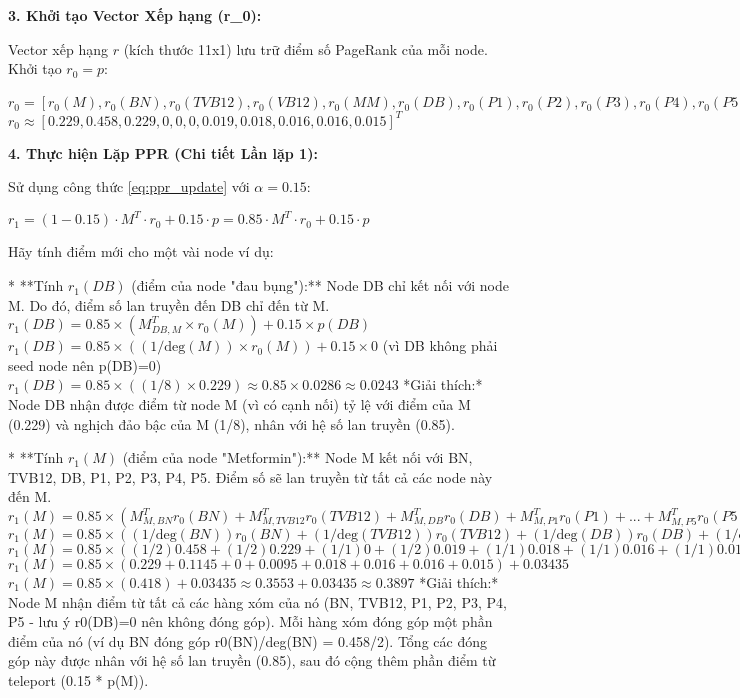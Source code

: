 \documentclass[../main.tex]{subfiles}
\begin{document}
\textbf{3. Khởi tạo Vector Xếp hạng (r_0):}

Vector xếp hạng \(r\) (kích thước 11x1) lưu trữ điểm số PageRank của mỗi node. Khởi tạo \(r_0 = p\):

\(r_0 = [r_0(M), r_0(BN), r_0(TVB12), r_0(VB12), r_0(MM), r_0(DB), r_0(P1), r_0(P2), r_0(P3), r_0(P4), r_0(P5)]^T\)
\(r_0 \approx [0.229, 0.458, 0.229, 0, 0, 0, 0.019, 0.018, 0.016, 0.016, 0.015]^T\)

\textbf{4. Thực hiện Lặp PPR (Chi tiết Lần lặp 1):}

Sử dụng công thức \ref{eq:ppr_update} với \(\alpha = 0.15\):

\(r_{1} = (1-0.15) \cdot M^T \cdot r_0 + 0.15 \cdot p = 0.85 \cdot M^T \cdot r_0 + 0.15 \cdot p\)

Hãy tính điểm mới cho một vài node ví dụ:

*   **Tính \(r_1(DB)\) (điểm của node "đau bụng"):**
    Node DB chỉ kết nối với node M. Do đó, điểm số lan truyền đến DB chỉ đến từ M.
    \(r_1(DB) = 0.85 \times (M^T_{DB, M} \times r_0(M)) + 0.15 \times p(DB)\)
    \(r_1(DB) = 0.85 \times ( (1 / \text{deg}(M)) \times r_0(M) ) + 0.15 \times 0\) (vì DB không phải seed node nên p(DB)=0)
    \(r_1(DB) = 0.85 \times ( (1/8) \times 0.229 ) \approx 0.85 \times 0.0286 \approx 0.0243\)
    *Giải thích:* Node DB nhận được điểm từ node M (vì có cạnh nối) tỷ lệ với điểm của M (0.229) và nghịch đảo bậc của M (1/8), nhân với hệ số lan truyền (0.85).

*   **Tính \(r_1(M)\) (điểm của node "Metformin"):**
    Node M kết nối với BN, TVB12, DB, P1, P2, P3, P4, P5. Điểm số sẽ lan truyền từ tất cả các node này đến M.
    \(r_1(M) = 0.85 \times ( M^T_{M,BN}r_0(BN) + M^T_{M,TVB12}r_0(TVB12) + M^T_{M,DB}r_0(DB) + M^T_{M,P1}r_0(P1) + ... + M^T_{M,P5}r_0(P5) ) + 0.15 \times p(M)\)
    \(r_1(M) = 0.85 \times ( (1/\text{deg}(BN))r_0(BN) + (1/\text{deg}(TVB12))r_0(TVB12) + (1/\text{deg}(DB))r_0(DB) + (1/\text{deg}(P1))r_0(P1) + ... ) + 0.15 \times 0.229\)
    \(r_1(M) = 0.85 \times ( (1/2)0.458 + (1/2)0.229 + (1/1)0 + (1/2)0.019 + (1/1)0.018 + (1/1)0.016 + (1/1)0.016 + (1/1)0.015 ) + 0.03435\)
    \(r_1(M) = 0.85 \times ( 0.229 + 0.1145 + 0 + 0.0095 + 0.018 + 0.016 + 0.016 + 0.015 ) + 0.03435\)
    \(r_1(M) = 0.85 \times ( 0.418 ) + 0.03435 \approx 0.3553 + 0.03435 \approx 0.3897\)
    *Giải thích:* Node M nhận điểm từ tất cả các hàng xóm của nó (BN, TVB12, P1, P2, P3, P4, P5 - lưu ý r0(DB)=0 nên không đóng góp). Mỗi hàng xóm đóng góp một phần điểm của nó (ví dụ BN đóng góp r0(BN)/deg(BN) = 0.458/2). Tổng các đóng góp này được nhân với hệ số lan truyền (0.85), sau đó cộng thêm phần điểm từ teleport (0.15 * p(M)).
\end{document}
